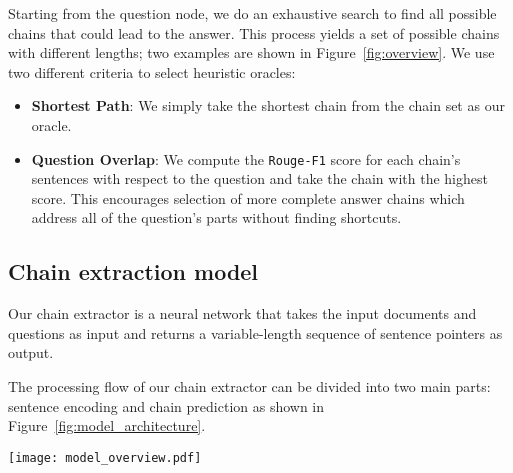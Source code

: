 \documentclass[11pt,a4paper]{article}
\begin{document}
Starting from the question node, we do an exhaustive search to find all possible chains that could lead to the answer. This process yields a set of possible chains with different lengths; two examples are shown in Figure~\ref{fig:overview}. We use two different criteria to select heuristic oracles:
\begin{itemize}
    \item \textbf{Shortest Path}: We simply take the shortest chain from the chain set as our oracle.
    \item \textbf{Question Overlap}: We compute the \texttt{Rouge-F1} score for each chain's sentences with respect to the question and take the chain with the highest score. This encourages selection of more complete answer chains which address all of the question's parts without finding shortcuts. 
\end{itemize}





\subsection{Chain extraction model}

Our chain extractor is a neural network that takes the input documents and questions as input and returns a variable-length sequence of sentence pointers as output.

The processing flow of our chain extractor can be divided into two main parts: sentence encoding and chain prediction as shown in Figure~\ref{fig:model_architecture}.

\begin{figure*}[t]
\centering
\texttt{[image: model\_overview.pdf]}
\caption{The BERT-Para variant of our proposed chain extractor. Left side: we encode each document paragraph jointly with the question and use pooling to form sentence representations. Right side: a pointer network extracts a sequence of sentences.}
\vspace{-0.5cm}
    \label{fig:model_architecture}
\end{figure*}
\end{document}
